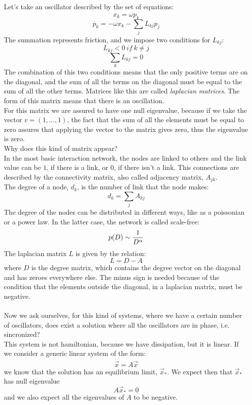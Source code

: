 Let's take an oscillator described by the set of equations:
$$
	\dot{x_k} = \omega p_k 
$$
$$
	\dot{p_k} = -\omega x_k - \sum_j L_{kj} p_j
$$
The summation represents friction, and we impose two conditions for $L_{kj}$:
$$
	L_{kj} < 0 \ if \ k\neq j
$$
$$
	\sum_k L_{kj} = 0
$$
The combination of this two conditions means that the only positive terms are on the diagonal, and the sum of all the terms on the diagonal must be equal to the sum of all the other terms. Matrices like this are called \emph{laplacian matrices}. The form of this matrix means that there is an oscillation. \\
For this matrix we are assured to have one null eigenvalue, because if we take the vector $v = (1,...,1)$, the fact that the sum of all the elements must be equal to zero assures that applying the vector to the matrix gives zero, thus the eigenvalue is zero. \\
Why does this kind of matrix appear? \\ 
In the most basic interaction network, the nodes are linked to others and the link value can be $1$, if there is a link, or $0$, if there isn't a link. This connections are described by the connectivity matrix, also called adjacency matrix, $A_{jk}$. \\
The degree of a node, $d_k$, is the number of link that the node makes:
$$
	d_k = \sum_j A_{kj}
$$
The degree of the nodes can be distributed in different ways, like as a poissonian or a power law. In the latter case, the network is called scale-free:
$$
	p(D) \sim \frac{1}{D^\alpha}
$$
The laplacian matrix $L$ is given by the relation:
$$
	L = D - A
$$
where $D$ is the degree matrix, which contains the degree vector on the diagonal and has zeroes everywhere else. The minus sign is needed because of the condition that the elements outside the diagonal, in a laplacian matrix, must be negative. \\ \\
Now we ask ourselves, for this kind of systems, where we have a certain number of oscillators, does exist a solution where all the oscillators are in phase, i.e. sincronized? \\
This system is not hamiltonian, because we have dissipation, but it is linear. If we consider a generic linear system of the form:
$$
	\dot{\vec{x}} = A \vec{x}
$$
we know that the solution has an equilibrium limit, $\vec{x}_*$. We expect then that $\vec{x}_*$ has null eigenvalue
$$
	A \vec{x}_* = 0
$$
and we also expect all the eigenvalues of $A$ to be negative. \\
